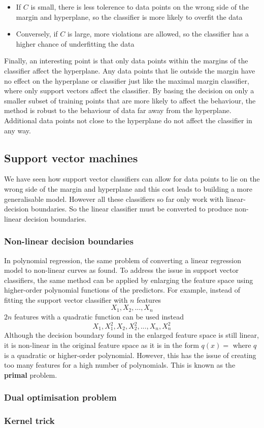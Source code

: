 \documentclass[CS5104-Notes.tex]{subfiles}
\begin{document}
\begin{itemize}
\item If $C$ is small, there is less tolerence to data points on the wrong side of the margin and hyperplane, so the classifier is more likely to overfit the data
\item Conversely, if $C$ is large, more violations are allowed, so the classifier has a higher chance of underfitting the data
\end{itemize}
Finally, an interesting point is that only data points within the margins of the classifier affect the hyperplane. Any data points that lie outside the margin have no effect on the hyperplane or classifier just like the maximal margin classifier, where only support vectors affect the classifier. By basing the decision on only a smaller subset of training points that are more likely to affect the behaviour, the method is robust to the behaviour of data far away from the hyperplane. Additional data points not close to the hyperplane do not affect the classifier in any way.

\subsection{Support vector machines}
We have seen how support vector classifiers can allow for data points to lie on the wrong side of the margin and hyperplane and this cost leads to building a more generalisable model. However all these classifiers so far only work with linear-decision boundaries. So the linear classifier must be converted to produce non-linear decision boundaries.

\subsubsection{Non-linear decision boundaries}
In polynomial regression, the same problem of converting a linear regression model to non-linear curves as found. To address the issue in support vector classifiers, the same method can be applied by enlarging the feature space using higher-order polynomial functions of the predictors. For example, instead of fitting the support vector classifier with $n$ features
\begin{equation*}
X_{1}, X_{2}, ..., X_{n}
\end{equation*}
$2n$ features with a quadratic function can be used instead
\begin{equation*}
X_{1}, X_{1}^{2}, X_{2}, X_{2}^{2}, ..., X_{n}, X_{n}^{2}
\end{equation*}
Although the decision boundary found in the enlarged feature space is still linear, it is non-linear in the original feature space as it is in the form $q(x) = $ where $q$ is a quadratic or higher-order polynomial. However, this has the issue of creating too many features for a high number of polynomials. This is known as the \textbf{primal} problem.

\subsubsection{Dual optimisation problem}

\subsubsection{Kernel trick}
\end{document}
